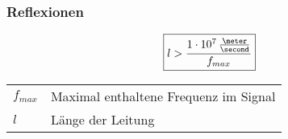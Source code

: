 \subsubsection{Reflexionen}

\begin{minipage}[c]{0.3\columnwidth}
    $$ \boxed{ l > \frac{1 \cdot 10^7 \, \frac{\meter}{\second} }{f_{max}} } $$
\end{minipage}
\hfill
\begin{minipage}[c]{0.68\columnwidth}
    \begin{tabular}{ll}
        $f_{max}$   & Maximal enthaltene Frequenz im Signal \\
        $l$         & Länge der Leitung 
    \end{tabular}
\end{minipage}